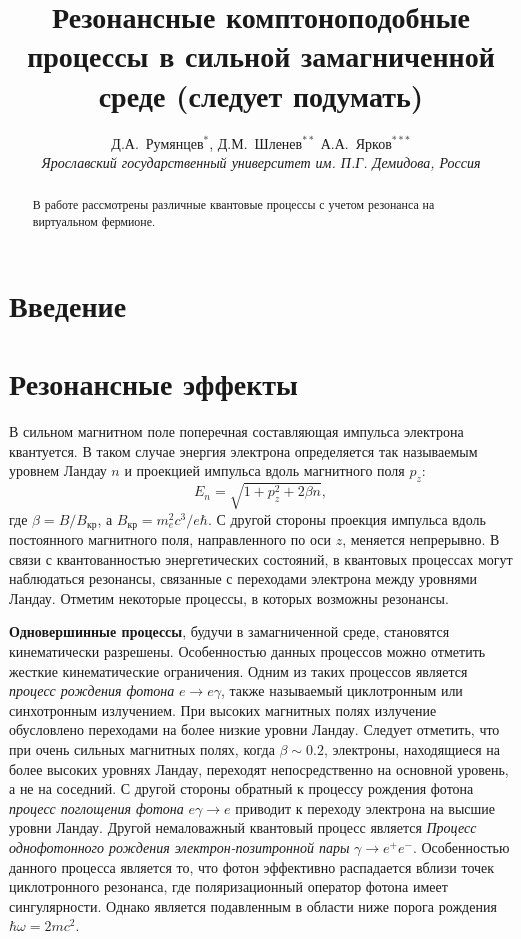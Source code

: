 \documentclass[12pt]{article}
\title{Резонансные комптоноподобные процессы в сильной замагниченной среде (следует подумать)}
\author{Д.А.~Румянцев$^{*}$, Д.М.~Шленев$^{**}$
А.А.~Ярков$^{***}$
\\
{\it Ярославский государственный университет им. П.Г. Демидова, Россия}}
\date{}
\begin{document}
\large

\maketitle

\def\abstractname{\empty}

\baselineskip=22pt

\begin{abstract}

\baselineskip=20pt

{\large В работе рассмотрены различные квантовые процессы с учетом резонанса на виртуальном фермионе.}
\end{abstract}

{\def\thefootnote{*}
\def\thefootnote{**}
\def\thefootnote{***}
}

\newpage
\unitlength 1mm

\section{Введение}
\section{Резонансные эффекты}
	В сильном магнитном поле поперечная составляющая импульса электрона квантуется. В таком случае энергия электрона определяется так называемым уровнем Ландау $n$ и проекцией импульса вдоль магнитного поля $p_z$:
	\begin{equation}
		E_n = \sqrt{1+p_z^2+2\beta n},
	\end{equation}
	где $\beta=B/B_{кр}$, а $B_{кр} = m_e^2 c^3/e\hbar$. С другой стороны проекция импульса вдоль постоянного магнитного поля, направленного по оси $z$, меняется непрерывно. В связи с квантованностью энергетических состояний, в квантовых процессах могут наблюдаться резонансы, связанные с переходами электрона между уровнями Ландау. Отметим некоторые процессы, в которых возможны резонансы.
	
{\bf Одновершинные процессы}, будучи в замагниченной среде, становятся кинематически разрешены. Особенностью данных процессов можно отметить жесткие кинематические ограничения. Одним из таких процессов является \textit{процесс рождения фотона} $e\to e\gamma $, также называемый циклотронным или синхотронным излучением.  При высоких магнитных полях излучение обусловлено переходами на более низкие уровни Ландау. Следует отметить, что при очень сильных магнитных полях, когда $\beta\sim0.2$, электроны, находящиеся на более высоких уровнях Ландау, переходят непосредственно на основной уровень, а не на соседний. С другой стороны обратный к процессу рождения фотона	\textit{процесс поглощения фотона} $e\gamma \to e$  приводит к переходу электрона на высшие уровни Ландау. Другой немаловажный квантовый процесс является \textit{Процесс однофотонного рождения электрон-позит\-ронной пары} $\gamma \to e^+e^-$. Особенностью данного процесса является то, что фотон эффективно распадается вблизи точек циклотронного резонанса, где поляризационный оператор фотона имеет сингулярности. Однако является подавленным в области ниже порога рождения $\hbar \omega = 2mc^2$.
		
\end{document}
